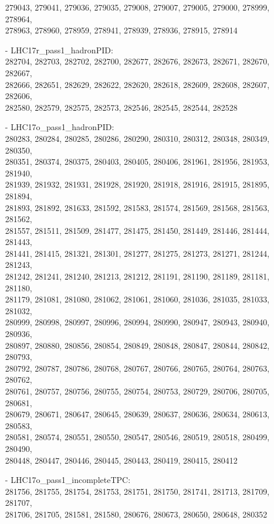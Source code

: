 \begin{appendix}
\begin{itemize}
     279043, 279041, 279036, 279035, 279008, 279007, 279005, 279000, 278999, 278964,\\
     278963, 278960, 278959, 278941, 278939, 278936, 278915, 278914
    \item[-] LHC17r\_pass1\_hadronPID:\\[1pt] 
     282704, 282703, 282702, 282700, 282677, 282676, 282673, 282671, 282670, 282667,\\
     282666, 282651, 282629, 282622, 282620, 282618, 282609, 282608, 282607, 282606,\\
     282580, 282579, 282575, 282573, 282546, 282545, 282544, 282528
    \item[-] LHC17o\_pass1\_hadronPID:\\[1pt]
     280283, 280284, 280285, 280286, 280290, 280310, 280312, 280348, 280349, 280350,\\
     280351, 280374, 280375, 280403, 280405, 280406, 281961, 281956, 281953, 281940,\\
     281939, 281932, 281931, 281928, 281920, 281918, 281916, 281915, 281895, 281894,\\
     281893, 281892, 281633, 281592, 281583, 281574, 281569, 281568, 281563, 281562,\\
     281557, 281511, 281509, 281477, 281475, 281450, 281449, 281446, 281444, 281443,\\
     281441, 281415, 281321, 281301, 281277, 281275, 281273, 281271, 281244, 281243,\\
     281242, 281241, 281240, 281213, 281212, 281191, 281190, 281189, 281181, 281180,\\
     281179, 281081, 281080, 281062, 281061, 281060, 281036, 281035, 281033, 281032,\\
     280999, 280998, 280997, 280996, 280994, 280990, 280947, 280943, 280940, 280936,\\
     280897, 280880, 280856, 280854, 280849, 280848, 280847, 280844, 280842, 280793,\\
     280792, 280787, 280786, 280768, 280767, 280766, 280765, 280764, 280763, 280762,\\
     280761, 280757, 280756, 280755, 280754, 280753, 280729, 280706, 280705, 280681,\\
     280679, 280671, 280647, 280645, 280639, 280637, 280636, 280634, 280613, 280583,\\
     280581, 280574, 280551, 280550, 280547, 280546, 280519, 280518, 280499, 280490,\\
     280448, 280447, 280446, 280445, 280443, 280419, 280415, 280412
    \item[-] LHC17o\_pass1\_incompleteTPC:\\[1pt]
     281756, 281755, 281754, 281753, 281751, 281750, 281741, 281713, 281709, 281707,\\
     281706, 281705, 281581, 281580, 280676, 280673, 280650, 280648, 280352
\end{itemize}


\end{appendix}
